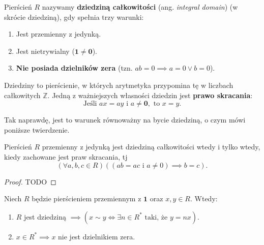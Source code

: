 \begin{definition}
	Pierścień $R$ nazywamy \textbf{dziedziną całkowitości} (ang. \textit{integral domain}) (w skrócie dziedziną), gdy spełnia trzy warunki:
    \begin{enumerate}
        \item Jest przemienny z jedynką.
        \item Jest nietrywialny ($\mathbf{1} \neq \mathbf{0}$).
        \item \textbf{Nie posiada dzielników zera} (tzn. $ab=0 \implies a=0 \lor b=0$).
    \end{enumerate}
\end{definition}
\begin{intuition}
    Dziedziny to pierścienie, w których arytmetyka przypomina tę w liczbach całkowitych $\mathbb{Z}$. Jedną z ważniejszych własności dziedzin jest \textbf{prawo skracania}:
    \[ \text{Jeśli } ax = ay \text{ i } a \neq \mathbf{0}, \text{ to } x = y. \]

    Tak naprawdę, jest to warunek równoważny na bycie dziedziną, o czym mówi poniższe twierdzenie.
\end{intuition}
\begin{theorem}	
	Pierścień $R$ przemienny z jedynką jest dziedziną całkowitości wtedy i tylko wtedy, kiedy zachowane jest praw skracania, tj
	\[
	\left(\forall a,b,c \in R \right)\left( \left(ab = ac \text{ i } a \neq 0 \right) \implies b = c\right)  
	.\] 
\end{theorem} 
\begin{proof}
	TODO
\end{proof} 
\begin{fact}
    Niech $R$ będzie pierścieniem przemiennym z $\mathbf{1}$ oraz $x,y \in R$. Wtedy:
    \begin{enumerate}[label=\arabic*)]
        \item $R$ jest dziedziną $\implies \left( x\sim y \iff \exists n \in R^{\ast} \text{ taki, że } y = nx \right)$.
        \item $x\in R^{\ast} \implies x$ nie jest dzielnikiem zera.
    \end{enumerate}
\end{fact}

